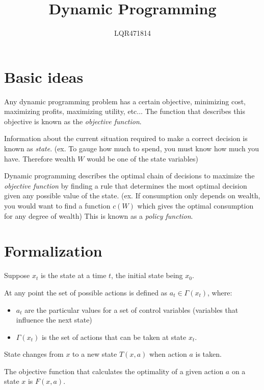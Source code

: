 \documentclass[a4paper, 12pt]{article}
\begin{document}
\title{Dynamic Programming}
\author{LQR471814}
\maketitle

\section{Basic ideas}

Any dynamic programming problem has a certain objective,
minimizing cost, maximizing profits, maximizing utility, etc...
The function that describes this objective is known as the
\emph{objective function}.

Information about the current situation required to make a correct
decision is known as \emph{state}. (ex. To gauge how much to
spend, you must know how much you have. Therefore wealth $W$ would
be one of the state variables)

Dynamic programming describes the optimal chain of decisions to
maximize the \emph{objective function} by finding a rule that
determines the most optimal decision given any possible value of
the state. (ex. If consumption only depends on wealth, you would
want to find a function $c(W)$ which gives the optimal consumption
for any degree of wealth) This is known as a \emph{policy
function}.

\section{Formalization}

Suppose $x_{t}$ is the state at a time $t$, the initial state
being $x_{0}$.

At any point the set of possible actions is defined as $a_{t} \in
\Gamma(x_{t})$, where:

\begin{itemize}
  \item $a_{t}$ are the particular values for a set of control
    variables (variables that influence the next state)
  \item $\Gamma(x_{t})$ is the set of actions that can be taken at
    state $x_{t}$.
\end{itemize}

State changes from $x$ to a new state $T(x, a)$ when action $a$ is
taken.

The objective function that calculates the optimality of a given
action $a$ on a state $x$ is $F(x, a)$.
\end{document}
